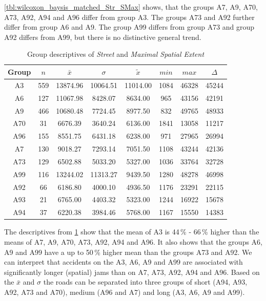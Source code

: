 \cref{tbl:wilcoxon_baysis_matched_Str_SMax} shows, that the groups A7, A9, A70, A73, A92, A94 and A96 differ from group A3. The groups A73 and A92 further differ from group A6 and A9. The group A99 differs from group A73 and group A92 differs from A99, but there is no distinctive general trend.
\begin{table}[ht!]
	\tiny
	\centering
	\begin{tabular}{c|c|c|c|c|c|c|c}
		\toprule
		Group & $n$ & $\bar{x}$ & $\sigma$ & $\tilde{x}$ & $min$ & $max$ & $\Delta$ \\  
		\midrule
		A3  & 559 & 13874.96 & 10064.51 & 11014.00 & 1084 & 46328 & 45244 \\ 
		A6  & 127 & 11067.98 & 8428.07  & 8634.00  & 965  & 43156 & 42191 \\ 
		A9  & 466 & 10680.48 & 7724.45  & 8977.50  & 832  & 49765 & 48933 \\ 
		A70 & 31  & 6676.39  & 3640.24  & 6136.00  & 1841 & 13058 & 11217 \\ 
		A96 & 155 & 8551.75  & 6431.18  & 6238.00  & 971  & 27965 & 26994 \\ 
		A7  & 130 & 9018.27  & 7293.14  & 7051.50  & 1108 & 43244 & 42136 \\ 
		A73 & 129 & 6502.88  & 5033.20  & 5327.00  & 1036 & 33764 & 32728 \\ 
		A99 & 116 & 13244.02 & 11313.27 & 9439.50  & 1280 & 48278 & 46998 \\ 
		A92 & 66  & 6186.80  & 4000.10  & 4936.50  & 1176 & 23291 & 22115 \\ 
		A93 & 21  & 6765.00  & 4403.32  & 5323.00  & 1244 & 16922 & 15678 \\ 
		A94 & 37  & 6220.38  & 3984.46  & 5768.00  & 1167 & 15550 & 14383 \\ 
		\bottomrule
	\end{tabular}
	\caption{Group descriptives of \textit{Street} and \textit{Maximal Spatial Extent}}
	\label{tbl:descriptives_baysis_matched_Str_SMax}
\end{table}
The descriptives from \cref{tbl:descriptives_baysis_matched_Str_SMax} show that the mean of A3 is 44\,\% - 66\,\% higher than the means of A7, A9, A70, A73, A92, A94 and A96. It also shows that the groups A6, A9 and A99 have a up to 50\,\% higher mean than the groups A73 and A92. We can interpret that accidents on the A3, A6, A9 and A99 are associated with significantly longer (spatial) jams than on A7, A73, A92, A94 and A96. Based on the $\bar{x}$ and $\sigma$ the roads can be separated into three groups of short (A94, A93, A92, A73 and A70), medium (A96 and A7) and long (A3, A6, A9 and A99).

